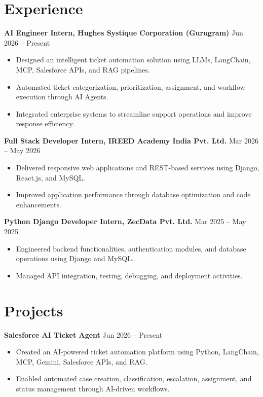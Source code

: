 \documentclass[10pt,a4paper]{article}
\begin{document}
\section{Experience}

\textbf{AI Engineer Intern, Hughes Systique Corporation (Gurugram)} \hfill Jun 2026 -- Present

\begin{itemize}
\item Designed an intelligent ticket automation solution using LLMs, LangChain, MCP, Salesforce APIs, and RAG pipelines.
\item Automated ticket categorization, prioritization, assignment, and workflow execution through AI Agents.
\item Integrated enterprise systems to streamline support operations and improve response efficiency.
\end{itemize}

\textbf{Full Stack Developer Intern, IREED Academy India Pvt. Ltd.} \hfill Mar 2026 -- May 2026

\begin{itemize}
\item Delivered responsive web applications and REST-based services using Django, React.js, and MySQL.
\item Improved application performance through database optimization and code enhancements.
\end{itemize}

\textbf{Python Django Developer Intern, ZecData Pvt. Ltd.} \hfill Mar 2025 -- May 2025

\begin{itemize}
\item Engineered backend functionalities, authentication modules, and database operations using Django and MySQL.
\item Managed API integration, testing, debugging, and deployment activities.
\end{itemize}

\section{Projects}

\textbf{Salesforce AI Ticket Agent} \hfill Jun 2026 -- Present

\begin{itemize}
\item Created an AI-powered ticket automation platform using Python, LangChain, MCP, Gemini, Salesforce APIs, and RAG.
\item Enabled automated case creation, classification, escalation, assignment, and status management through AI-driven workflows.
\end{itemize}
\end{document}
